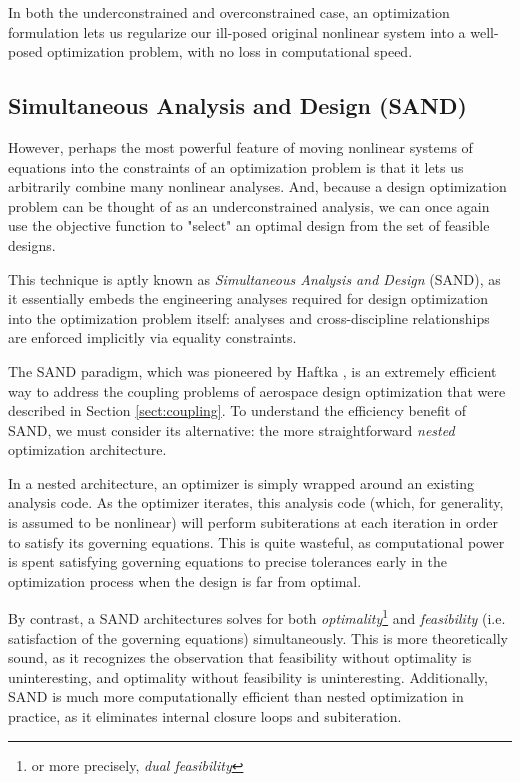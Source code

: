 In both the underconstrained and overconstrained case, an optimization formulation lets us regularize our ill-posed original nonlinear system into a well-posed optimization problem, with no loss in computational speed.

\subsection{Simultaneous Analysis and Design (SAND)}
\label{sect:sand}

However, perhaps the most powerful feature of moving nonlinear systems of equations into the constraints of an optimization problem is that it lets us arbitrarily combine many nonlinear analyses. And, because a design optimization problem can be thought of as an underconstrained analysis, we can once again use the objective function to "select" an optimal design from the set of feasible designs.

This technique is aptly known as \textit{Simultaneous Analysis and Design} (SAND), as it essentially embeds the engineering analyses required for design optimization into the optimization problem itself: analyses and cross-discipline relationships are enforced implicitly via equality constraints.

The SAND paradigm, which was pioneered by Haftka \cite{haftka}, is an extremely efficient way to address the coupling problems of aerospace design optimization that were described in Section \ref{sect:coupling}. To understand the efficiency benefit of SAND, we must consider its alternative: the more straightforward \textit{nested} optimization architecture.

In a nested architecture, an optimizer is simply wrapped around an existing analysis code. As the optimizer iterates, this analysis code (which, for generality, is assumed to be nonlinear) will perform subiterations at each iteration in order to satisfy its governing equations. This is quite wasteful, as computational power is spent satisfying governing equations to precise tolerances early in the optimization process when the design is far from optimal.


By contrast, a SAND architectures solves for both \textit{optimality}\footnote{or more precisely, \textit{dual feasibility}} and \textit{feasibility} (i.e. satisfaction of the governing equations) simultaneously. This is more theoretically sound, as it recognizes the observation that feasibility without optimality is uninteresting, and optimality without feasibility is uninteresting. Additionally, SAND is much more computationally efficient than nested optimization in practice, as it eliminates internal closure loops and subiteration.

